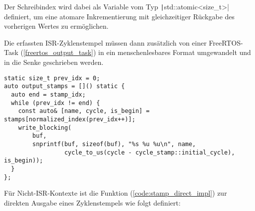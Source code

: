 Der Schreibindex wird dabei als Variable vom Typ
\texttt|std::atomic<size_t>| definiert, um eine atomare Inkrementierung
mit gleichzeitiger Rückgabe des vorherigen Wertes zu ermöglichen.

%

Die erfassten ISR-Zyklenstempel müssen dann zusätzlich von einer FreeRTOS-Task
(\ref{freertos_output_task}) in ein menschenlesbares Format umgewandelt und in
die Senke geschrieben werden.

\begin{code}
    \begin{verbatim}
static size_t prev_idx = 0;
auto output_stamps = []() static {
  auto end = stamp_idx;
  while (prev_idx != end) {
    const auto& [name, cycle, is_begin] = stamps[normalized_index(prev_idx++)];
    write_blocking(
        buf,
        snprintf(buf, sizeof(buf), "%s %u %u\n", name,
                 cycle_to_us(cycle - cycle_stamp::initial_cycle), is_begin));
  }
};
    \end{verbatim}
    \label{freertos_output_task}
\end{code}

Für Nicht-ISR-Kontexte ist die Funktion (\ref{code:stamp_direct_impl}) zur
direkten Ausgabe eines Zyklenstempels wie folgt definiert:

